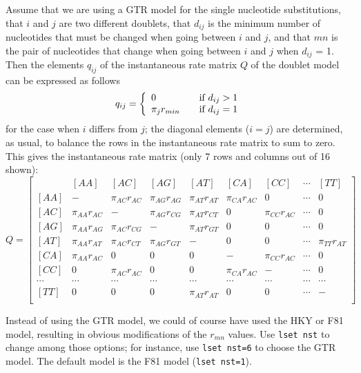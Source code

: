 \documentclass[12pt]{book}
\begin{document}
Assume that we are using a GTR model for the single nucleotide substitutions, that $i$ and $j$ are
two different doublets, that $d_{ij}$ is the minimum number of nucleotides that must be changed
when going between $i$ and $j$, and that $mn$ is the pair of nucleotides that change when going
between $i$ and $j$ when $d_{ij}$ = 1. Then the elements $q_{ij}$ of the instantaneous rate matrix
$Q$ of the doublet model can be expressed as follows
\[
q_{ij} = \left\{
\begin{array}{l l}
  0 & \quad \text{if} ~d_{ij}>1 \\
 \pi_j r_{min} & \quad \text{if} ~d_{ij}=1\\
\end{array} \right.
\]
for the case when $i$ differs from $j$; the diagonal elements ($i = j$) are determined, as usual,
to balance the rows in the instantaneous rate matrix to sum to zero. This gives the instantaneous
rate matrix (only 7 rows and columns out of 16 shown):
\footnotesize
\[
Q=\begin{bmatrix}
    & [AA] & [AC] & [AG] & [AT] & [CA] & [CC] & \cdots & [TT]\\
 [AA]& - & \pi_{AC} r_{AC} & \pi_{AG} r_{AG} & \pi_{AT} r_{AT}& \pi_{CA} r_{AC} & 0 & \cdots & 0\\
 [AC]& \pi_{AA} r_{AC} & - & \pi_{AG} r_{CG} & \pi_{AT} r_{CT}& 0 & \pi_{CC} r_{AC} & \cdots & 0\\
 [AG]& \pi_{AA} r_{AG} & \pi_{AC} r_{CG} & - & \pi_{AT} r_{GT}& 0 & 0 & \cdots & 0 \\
 [AT]& \pi_{AA} r_{AT} & \pi_{AC} r_{CT} & \pi_{AG} r_{GT}& -& 0 & 0 & \cdots &  \pi_{TT} r_{AT}\\
 [CA]& \pi_{AA} r_{AC} & 0 & 0 & 0 & - &  \pi_{CC} r_{AC} & \cdots & 0\\
 [CC]& 0 & \pi_{AC} r_{AC} & 0 & 0 & \pi_{CA} r_{AC} & -  & \cdots & 0\\
 \cdots& \cdots& \cdots& \cdots& \cdots& \cdots& \cdots& \cdots& \cdots\\
 [TT]& 0 & 0 & 0 &\pi_{AT} r_{AT} & 0 & 0 & \cdots & -\\
\end{bmatrix}
\]
\normalsize

Instead of using the GTR model, we could of course have used the HKY or F81 model, resulting in
obvious modifications of the $r_{mn}$ values. Use \texttt{lset nst} to change among those options;
for instance, use \texttt{lset nst=6} to choose the GTR model. The default model is the F81 model
(\texttt{lset nst=1}).
\end{document}
